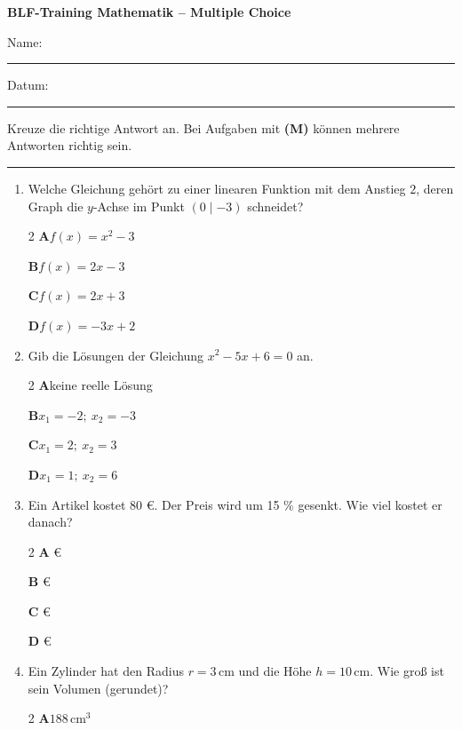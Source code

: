 \documentclass[11pt]{article}
\newcommand\kaestchen[1]{\makebox[1.4em][l]{$\square$}\textbf{#1}\enspace}
\begin{document}
{\sffamily\bfseries\Large BLF-Training Mathematik – Multiple Choice}\par\smallskip
Name: \rule{7cm}{0.4pt}\hfill Datum: \rule{3cm}{0.4pt}\par\medskip
{\small Kreuze die richtige Antwort an. Bei Aufgaben mit \textbf{(M)} können mehrere Antworten richtig sein.}
\par\medskip\hrule\medskip
\begin{enumerate}
\item Welche Gleichung gehört zu einer linearen Funktion mit dem Anstieg $2$, deren Graph die $y$-Achse im Punkt $(0 \mid -3)$ schneidet?\par\nopagebreak
\begin{multicols}{2}
\kaestchen{A}$f(x) = x^2 - 3$\par
\kaestchen{B}$f(x) = 2x - 3$\par
\kaestchen{C}$f(x) = 2x + 3$\par
\kaestchen{D}$f(x) = -3x + 2$\par
\end{multicols}
\item Gib die Lösungen der Gleichung $x^2 - 5x + 6 = 0$ an.\par\nopagebreak
\begin{multicols}{2}
\kaestchen{A}keine reelle Lösung\par
\kaestchen{B}$x_1 = -2;\ x_2 = -3$\par
\kaestchen{C}$x_1 = 2;\ x_2 = 3$\par
\kaestchen{D}$x_1 = 1;\ x_2 = 6$\par
\end{multicols}
\item Ein Artikel kostet 80 €. Der Preis wird um 15 \% gesenkt. Wie viel kostet er danach?\par\nopagebreak
\begin{multicols}{2}
\kaestchen{A}68 €\par
\kaestchen{B}72 €\par
\kaestchen{C}65 €\par
\kaestchen{D}92 €\par
\end{multicols}
\item Ein Zylinder hat den Radius $r = 3\,\text{cm}$ und die Höhe $h = 10\,\text{cm}$. Wie groß ist sein Volumen (gerundet)?\par\nopagebreak
\begin{multicols}{2}
\kaestchen{A}$188\,\text{cm}^3$\par

\end{multicols}
\end{enumerate}
\end{document}
